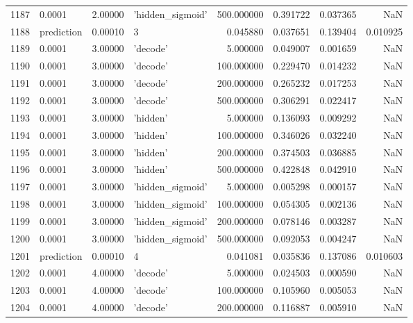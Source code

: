 \documentclass[10pt,a4paper]{article}
\begin{document}
\begin{tabular}{llrlrrrr}
1187 &      0.0001 &   2.00000 &   'hidden\_sigmoid' &  500.000000 &  0.391722 &  0.037365 &       NaN \\
1188 &  prediction &   0.00010 &                  3 &    0.045880 &  0.037651 &  0.139404 &  0.010925 \\
1189 &      0.0001 &   3.00000 &           'decode' &    5.000000 &  0.049007 &  0.001659 &       NaN \\
1190 &      0.0001 &   3.00000 &           'decode' &  100.000000 &  0.229470 &  0.014232 &       NaN \\
1191 &      0.0001 &   3.00000 &           'decode' &  200.000000 &  0.265232 &  0.017253 &       NaN \\
1192 &      0.0001 &   3.00000 &           'decode' &  500.000000 &  0.306291 &  0.022417 &       NaN \\
1193 &      0.0001 &   3.00000 &           'hidden' &    5.000000 &  0.136093 &  0.009292 &       NaN \\
1194 &      0.0001 &   3.00000 &           'hidden' &  100.000000 &  0.346026 &  0.032240 &       NaN \\
1195 &      0.0001 &   3.00000 &           'hidden' &  200.000000 &  0.374503 &  0.036885 &       NaN \\
1196 &      0.0001 &   3.00000 &           'hidden' &  500.000000 &  0.422848 &  0.042910 &       NaN \\
1197 &      0.0001 &   3.00000 &   'hidden\_sigmoid' &    5.000000 &  0.005298 &  0.000157 &       NaN \\
1198 &      0.0001 &   3.00000 &   'hidden\_sigmoid' &  100.000000 &  0.054305 &  0.002136 &       NaN \\
1199 &      0.0001 &   3.00000 &   'hidden\_sigmoid' &  200.000000 &  0.078146 &  0.003287 &       NaN \\
1200 &      0.0001 &   3.00000 &   'hidden\_sigmoid' &  500.000000 &  0.092053 &  0.004247 &       NaN \\
1201 &  prediction &   0.00010 &                  4 &    0.041081 &  0.035836 &  0.137086 &  0.010603 \\
1202 &      0.0001 &   4.00000 &           'decode' &    5.000000 &  0.024503 &  0.000590 &       NaN \\
1203 &      0.0001 &   4.00000 &           'decode' &  100.000000 &  0.105960 &  0.005053 &       NaN \\
1204 &      0.0001 &   4.00000 &           'decode' &  200.000000 &  0.116887 &  0.005910 &       NaN \\

\end{tabular}
\end{document}
